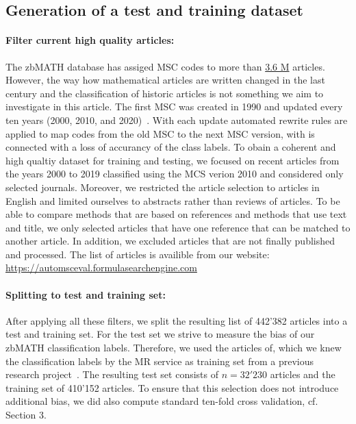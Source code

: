 \subsection{Generation of a test and training dataset}
\paragraph{Filter current high quality articles:}
The zbMATH database has assiged MSC codes to more than
\href{https://zbmath.org/?q=cc%3A*}%
{3.6 M} articles.
However, the way how mathematical articles are written changed in the last century and the classification of historic articles is not something we aim to investigate in this article.
The first MSC was created in 1990 and updated every ten years (2000, 2010, and 2020)~\cite{MSC2010}.
With each update automated rewrite rules are applied to map codes from the old MSC to the next MSC version, with is connected with a loss of accurancy of the class labels.
To obain a coherent and high qualtiy dataset for training and testing, we focused on recent articles from the years 2000 to 2019 classified using the MCS verion 2010 and considered only selected journals.
Moreover, we restricted the article selection to articles in English and limited ourselves to abstracts rather than reviews of articles.
To be able to compare methods that are based on references and methods that use text and title, we only selected articles that have one reference that
can be matched to another article.
In addition, we excluded articles that are not finally published and processed. The list of articles is availible from our website: \url{https://automsceval.formulasearchengine.com}
\paragraph{Splitting to test and training set:}
After applying all these filters, we split the resulting list of 442'382 articles into a test and training set.
For the test set we strive to measure the bias of our zbMATH classification labels.
Therefore, we used the articles of, which we knew the classification labels by the MR service as training set from a previous research project~\cite{Bannister2018}.
The resulting test set consists of $n=32'230$ articles and the training set of 410'152 articles.
To ensure that this selection does not introduce additional bias, we did also compute standard ten-fold cross validation, cf. Section 3.
